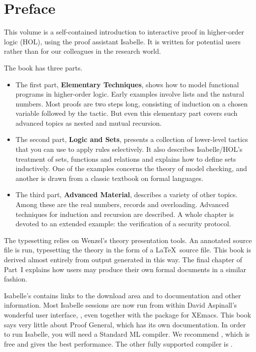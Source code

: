 \chapter*{Preface}

This volume is a self-contained introduction to interactive proof
in higher-order logic (HOL), using the proof assistant Isabelle. 
It is written for potential users rather
than for our colleagues in the research world.

The book has three parts.  
\begin{itemize}
\item 
The first part, \textbf{Elementary Techniques},
shows how to model functional programs in higher-order logic.  Early
examples involve lists and the natural numbers.  Most proofs
are two steps long, consisting of induction on a chosen variable
followed by the  tactic.  But even this elementary part
covers such advanced topics as nested and mutual recursion.
\item 
The second part, \textbf{Logic and Sets}, presents a collection of
lower-level tactics that you can use to apply rules selectively.  It
also describes Isabelle/HOL's treatment of sets, functions and
relations and explains how to define sets inductively.  One of the
examples concerns the theory of model checking, and another is drawn
from a classic textbook on formal languages.
\item 
The third part, \textbf{Advanced Material}, describes a variety of other
topics.  Among these are the real numbers, records and overloading.  Advanced
techniques for induction and recursion are described.  A whole chapter is
devoted to an extended example: the verification of a security protocol.
\end{itemize}

The typesetting relies on Wenzel's theory presentation tools.  An
annotated source file is run, typesetting the theory
in the form of a \LaTeX\ source file.  This book is derived almost entirely
from output generated in this way.  The final chapter of Part~I explains how
users may produce their own formal documents in a similar fashion.

Isabelle's  contains links to
the download area and to documentation and other information.  Most Isabelle
sessions are now run from within David Aspinall's
wonderful user interface, , even together with the
 package for XEmacs.  This
book says very little about Proof General, which has its own documentation.
In order to run Isabelle, you will need a Standard ML compiler.  We recommend
, which is free and gives the best
performance.  The other fully supported compiler is
.


